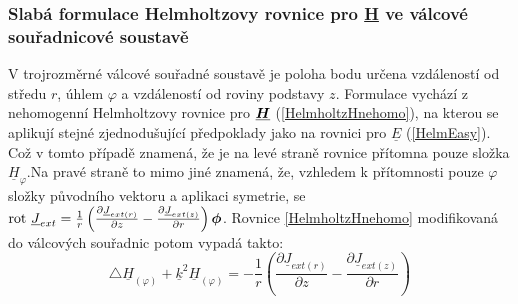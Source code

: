 \documentclass[12pt,a4paper,oneside]{article}
\numberwithin{equation}{section} %
\numberwithin{figure}{section} %
\numberwithin{table}{section} %
\renewcommand{\vec}[1]{\mbox{\boldmath$#1$}} %
\newcommand{\faz}[1]{{\underline{#1}}} %
\newcommand{\rot}{\mathrm{rot}\ }
\begin{document}
\subsubsection{Slabá formulace Helmholtzovy rovnice pro \faz{H} ve válcové souřadnicové soustavě}

V trojrozměrné válcové souřadné soustavě je poloha bodu určena vzdáleností od středu $r$, úhlem $\varphi$ a vzdáleností od roviny podstavy $z$. Formulace vychází z nehomogenní Helmholtzovy rovnice pro $\faz{\vec{H}}$ (\ref{HelmholtzHnehomo}), na kterou se aplikují stejné zjednodušující předpoklady jako na rovnici pro $\faz{E}$ (\ref{HelmEasy}). Což v tomto případě znamená, že je na levé straně rovnice přítomna pouze složka $\faz{H} _{\varphi}$.Na pravé straně to mimo jiné znamená, že, vzhledem k přítomnosti pouze $\varphi$ složky původního vektoru a aplikaci symetrie, se $\rot \faz{J} _{ext} = \frac{1}{r} \left( \frac{\partial \faz{J} _{ext(r)}}{\partial z} - \frac{\partial \faz{J} _{ext(z)}}{\partial r} \right) \vec{\phi}$. Rovnice \ref{HelmholtzHnehomo} modifikovaná do válcových souřadnic potom vypadá takto:
\begin{equation}
\triangle \faz{H} _{(\varphi)} + \faz{k} ^2 \faz{H} _{(\varphi)} = - \frac{1}{r} \left(  \frac{\partial \faz{J} _{ext(r)}}{\partial z} - \frac{\partial \faz{J} _{ext(z)}}{\partial r} \right)
\end{equation}
\end{document}
